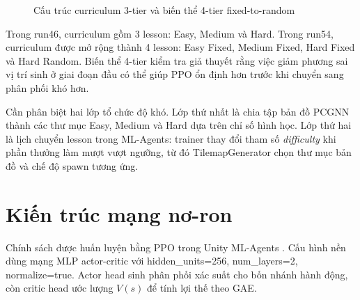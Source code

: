 \begin{figure}[H]
    \centering
    \caption{Cấu trúc curriculum 3-tier và biến thể 4-tier fixed-to-random}
    \label{fig:curriculum_structure}
\end{figure}

Trong run46, curriculum gồm 3 lesson: Easy, Medium và Hard. Trong run54, curriculum được mở rộng thành 4 lesson: Easy Fixed, Medium Fixed, Hard Fixed và Hard Random. Biến thể 4-tier kiểm tra giả thuyết rằng việc giảm phương sai vị trí sinh ở giai đoạn đầu có thể giúp PPO ổn định hơn trước khi chuyển sang phân phối khó hơn.

Cần phân biệt hai lớp tổ chức độ khó. Lớp thứ nhất là chia tập bản đồ PCGNN thành các thư mục Easy, Medium và Hard dựa trên chỉ số hình học. Lớp thứ hai là lịch chuyển lesson trong ML-Agents: trainer thay đổi tham số \emph{difficulty} khi phần thưởng làm mượt vượt ngưỡng, từ đó TilemapGenerator chọn thư mục bản đồ và chế độ spawn tương ứng.

\section{Kiến trúc mạng nơ-ron}

Chính sách được huấn luyện bằng PPO trong Unity ML-Agents \cite{Juliani2018}. Cấu hình nền dùng mạng MLP actor-critic với hidden\_units=256, num\_layers=2, normalize=true. Actor head sinh phân phối xác suất cho bốn nhánh hành động, còn critic head ước lượng $V(s)$ để tính lợi thế theo GAE.

